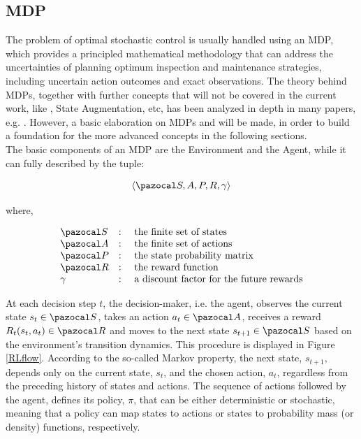 

\subsection{\acrfull{MDP}} \label{mdpSec}

The problem of optimal stochastic control is usually handled using an \gls{MDP}, which provides a principled mathematical methodology that can address the uncertainties of planning optimum inspection and maintenance strategies,  including uncertain action outcomes and exact observations. The theory behind \glspl{MDP}, together with further concepts that will not be covered in the current work, like , State Augmentation, etc, has been analyzed in depth in many papers, e.g. \cite{papakonstantinou2014planning1}. However, a basic elaboration on \glspl{MDP} and  will be made, in order to build a foundation for the more advanced concepts in the following sections.\\

The basic components of an \gls{MDP} are the Environment and the Agent, while it can  fully described by the tuple:

$$\langle \ccal{S,A,P,R}, \gamma \rangle$$

where, 

\begin{equation*}
    \begin{array}{lll}
        \ccal{S} & : & \text { the finite set of states } \\ 
        \ccal{A} & : & \text { the finite set of actions } \\ 
        \ccal{P} & : & \text { the state probability matrix } \\ 
        \ccal{R} & : & \text { the reward function } \\ 
        \gamma & : & \text{ a discount factor for the future rewards}
    \end{array}
\end{equation*}

At each decision step $t$, the decision-maker, i.e. the agent, observes the current state $s_t \in \ccal{S}$, takes an action $a_t\in \ccal{A}$, receives a reward $R_t(s_t, a_t)\in \ccal{R}$ and moves to the next state $s_{t+1}\in \ccal{S}$ based on the environment's transition dynamics. This procedure is displayed in Figure \ref{RLflow}. According to the so-called Markov property, the next state, $s_{t+1}$, depends only on the current state, $s_t$, and the chosen action, $a_t$, regardless from the preceding history of states and actions. The sequence of actions followed by the agent, defines its policy, $\pi$, that can be either deterministic or stochastic, meaning that a policy can map states to actions or states to probability mass (or density) functions, respectively.


